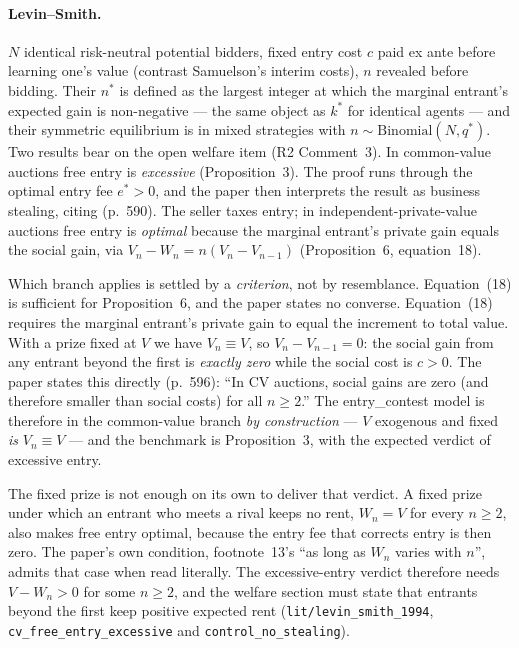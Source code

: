 \documentclass[11pt,a4paper]{article}
\begin{document}
\paragraph{Levin--Smith.} $N$ identical risk-neutral potential bidders, fixed
entry cost $c$ paid ex ante before learning one's value (contrast Samuelson's
interim costs), $n$ revealed before bidding. Their $n^*$ is defined as the
largest integer at which the marginal entrant's expected gain is non-negative
--- the same object as $k^*$ for identical agents --- and their symmetric
equilibrium is in mixed strategies with $n \sim \mathrm{Binomial}(N, q^*)$.
Two results bear on the open welfare item (R2 Comment~3). In common-value
auctions free entry is \emph{excessive} (Proposition~3). The proof runs through
the optimal entry fee $e^* > 0$, and the paper then interprets the result as
business stealing, citing \citet{MankiwWhinston1986} (p.~590). The seller taxes
entry;
in independent-private-value auctions free entry is \emph{optimal} because the
marginal entrant's private gain equals the social gain, via $V_n - W_n = n(V_n
- V_{n-1})$ (Proposition~6, equation~18).

Which branch applies is settled by a \emph{criterion}, not by resemblance.
Equation~(18) is sufficient for Proposition~6, and the paper states no
converse. Equation~(18) requires the marginal entrant's private gain to equal
the increment to total value. With a
prize fixed at $V$ we have $V_n \equiv V$, so $V_n - V_{n-1} = 0$: the social
gain from any entrant beyond the first is \emph{exactly zero} while the social
cost is $c>0$. The paper states this directly (p.~596): ``In CV auctions,
social gains are zero (and therefore smaller than social costs) for all
$n \geq 2$.'' The entry\_contest model is therefore in the common-value branch
\emph{by construction} --- $V$ exogenous and fixed \emph{is} $V_n \equiv V$ ---
and the benchmark is Proposition~3, with the expected verdict of excessive
entry.

The fixed prize is not enough on its own to deliver that verdict. A fixed prize
under which an entrant who meets a rival keeps no rent, $W_n = V$ for every
$n \geq 2$, also makes free entry optimal, because the entry fee that corrects
entry is then zero. The paper's own condition, footnote~13's ``as long as $W_n$
varies with $n$'', admits that case when read literally. The excessive-entry
verdict therefore needs $V - W_n > 0$ for some $n \geq 2$, and the welfare
section must state that entrants beyond the first keep positive expected rent
(\texttt{lit/levin\_smith\_1994}, \texttt{cv\_free\_entry\_excessive} and
\texttt{control\_no\_stealing}).
\end{document}
